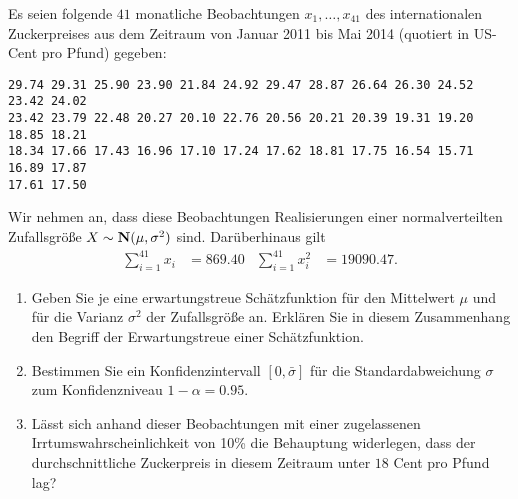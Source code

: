 Es seien folgende $41$ monatliche Beobachtungen $x_{1},\dots ,x_{41}$ des internationalen
Zuckerpreises aus dem Zeitraum von Januar 2011 bis Mai 2014 (quotiert in US-Cent
pro Pfund) gegeben:
\begin{lstlisting}
29.74 29.31 25.90 23.90 21.84 24.92 29.47 28.87 26.64 26.30 24.52 23.42 24.02
23.42 23.79 22.48 20.27 20.10 22.76 20.56 20.21 20.39 19.31 19.20 18.85 18.21
18.34 17.66 17.43 16.96 17.10 17.24 17.62 18.81 17.75 16.54 15.71 16.89 17.87
17.61 17.50
\end{lstlisting}
Wir nehmen an, dass diese Beobachtungen Realisierungen einer normalverteilten Zufallsgröße
$X \sim \mathbf{N}(\mu, \sigma^{2})$ sind. Darüberhinaus gilt
\begin{align*}
    \sum_{i=1}^{41} x_{i} &= 869.40 & \sum_{i=1}^{41} x_{i}^{2} &= 19090.47.
\end{align*}
\begin{enumerate}
    \item Geben Sie je eine erwartungstreue Schätzfunktion für den Mittelwert
        $\mu$ und für die Varianz $\sigma^2$ der Zufallsgr\"o{\ss}e an.
        Erkl\"aren Sie in diesem Zusammenhang den Begriff der Erwartungstreue
        einer Sch\"atzfunktion.

    \item Bestimmen Sie ein Konfidenzintervall $[0,\bar \sigma]$ für die
        Standardabweichung $\sigma$ zum Konfidenzniveau $1-\alpha = 0.95$.

    \item Lässt sich anhand dieser Beobachtungen mit einer zugelassenen
        Irrtumswahrscheinlichkeit von 10\% die Behauptung widerlegen, dass
        der durchschnittliche Zuckerpreis in diesem Zeitraum unter $18$ Cent
        pro Pfund lag?
\end{enumerate}

